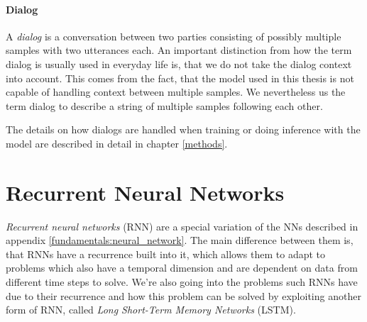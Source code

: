 \paragraph{Dialog} A \emph{dialog} is a conversation between two parties consisting of possibly multiple samples with two utterances each. An important distinction from how the term dialog is usually used in everyday life is, that we do not take the dialog context into account. This comes from the fact, that the model used in this thesis is not capable of handling context between multiple samples. We nevertheless us the term dialog to describe a string of multiple samples following each other.

The details on how dialogs are handled when training or doing inference with the model are described in detail in chapter \ref{methods}.

\section{Recurrent Neural Networks}
\emph{Recurrent neural networks} (RNN) are a special variation of the NNs described in appendix \ref{fundamentals:neural_network}. The main difference between them is, that RNNs have a recurrence built into it, which allows them to adapt to problems which also have a temporal dimension and are dependent on data from different time steps to solve. We're also going into the problems such RNNs have due to their recurrence and how this problem can be solved by exploiting another form of RNN, called \emph{Long Short-Term Memory Networks} (LSTM).

